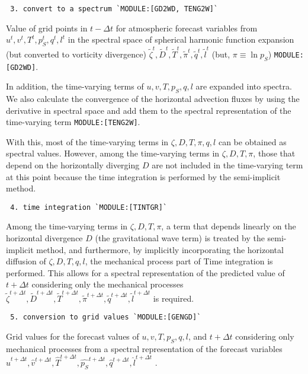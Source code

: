 \begin{verbatim}
 3. convert to a spectrum `MODULE:[GD2WD, TENG2W]`
\end{verbatim}

Value of grid points in \(t-\Delta t\) for atmospheric forecast
variables from \(u^{t}, v^{t}, T^{t}, p_S^{t}, q^{t}, l^{t}\) in the
spectral space of spherical harmonic function expansion (but converted
to vorticity divergence)
\(\tilde{\zeta}^{t}, \tilde{D}^{t}, \tilde{T}^{t}, \tilde{\pi}^{t}, \tilde{q}^{t}, \tilde{l}^{t}\)
(but, \(\pi \equiv \ln p_S\)) \texttt{MODULE:{[}GD2WD{]}}.

In addition, the time-varying terms of \(u, v, T, p_S, q, l\) are
expanded into spectra. We also calculate the convergence of the
horizontal advection fluxes by using the derivative in spectral space
and add them to the spectral representation of the time-varying term
\texttt{MODULE:{[}TENG2W{]}}.

With this, most of the time-varying terms in \(\zeta, D, T, \pi, q, l\)
can be obtained as spectral values. However, among the time-varying
terms in \(\zeta, D, T, \pi\), those that depend on the horizontally
diverging \(D\) are not included in the time-varying term at this point
because the time integration is performed by the semi-implicit method.

\begin{verbatim}
 4. time integration `MODULE:[TINTGR]`
\end{verbatim}

Among the time-varying terms in \(\zeta, D, T, \pi\), a term that
depends linearly on the horizontal divergence \(D\) (the gravitational
wave term) is treated by the semi-implicit method, and furthermore, by
implicitly incorporating the horizontal diffusion of
\(\zeta, D, T, q, l\), the mechanical process part of Time integration
is performed. This allows for a spectral representation of the predicted
value of \(t+\Delta t\) considering only the mechanical processes
\(\tilde{\zeta}^{t+\Delta t}, \tilde{D}^{t+\Delta t}, \tilde{T}^{t+\Delta t}, \tilde{\pi}^{t+\Delta t}, \tilde{q}^{t+\Delta t}, \tilde{l}^{t+\Delta t}\)
is required.

\begin{verbatim}
 5. conversion to grid values `MODULE:[GENGD]`
\end{verbatim}

Grid values for the forecast values of \(u, v, T, p_S, q, l\), and
\(t+\Delta t\) considering only mechanical processes from a spectral
representation of the forecast variables
\(\hat{u}^{t+\Delta t}, \hat{v}^{t+\Delta t}, \hat{T}^{t+\Delta t}, \hat{p_S}^{t+\Delta t}, \hat{q}^{t+\Delta t}, \hat{l}^{t+\Delta t}\)
.

